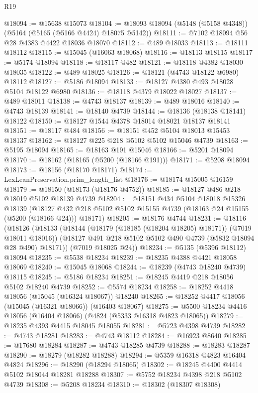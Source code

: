 \begin{lexlean}{R19}
\begin{coremodule}
{{{{{{{{{{{@18094 := @15638 @15073
@18104 := @18093 @18094 (@5148 (@5158 @4348)) (@5164 (@5165 (@5166 @4424) @18075 @5142))
@18111 := @7102 @18094 @56 @28 @4383 @4422 @18036 @18070
@18112 := @489 @18033
@18113 := @18111 @18112
@18115 := @15045 (@16063 @18068)
@18116 := @18113 @18115
@18117 := @5174 @18094
@18118 := @18117 @482
@18121 := @18118 @4382 @18030 @18035
@18122 := @489 @18025
@18126 := @18121 (@4743 @18122 @6980) @18112
@18127 := @5186 @18094
@18133 := @18127 @4380 @493 @18028 @5104 @18122 @6980
@18136 := @18118 @4379 @18022 @18027
@18137 := @489 @18011
@18138 := @4743 @18137
@18139 := @489 @18016
@18140 := @4743 @18139
@18141 := @18140 @4739
@18144 := @18136 (@18138 @18141) @18122
@18150 := @18127 @1544 @4378 @18014 @18021 @18137 @18141
@18151 := @18117 @484
@18156 := @18151 @452 @5104 @18013 @15453 @18137
@18162 := @18127 @225 @218 @5102 @5102 @15046 @4739
@18163 := @5195 @18094
@18165 := @18163 @191 @15046
@18166 := @5201 @18094
@18170 := @18162 (@18165 (@5200 (@18166 @191)))
@18171 := @5208 @18094
@18173 := @18156 (@18170 @18171)
@18174 := LexLeanPreservation.prim_length_list
@18176 := @18174 @15005 @16159
@18179 := @18150 (@18173 (@18176 @4752))
@18185 := @18127 @486 @218 @18019 @5102 @18139 @4739
@18204 := @18151
    @434
    @5104
    @18018
    @15326
    @18139
    (@18127 @432 @218 @5102 @5102 @15155 @4739 (@18163 @24 @15155 (@5200 (@18166 @24))) @18171)
@18205 := @18176 @4744
@18231 := @18116
    (@18126
      (@18133
        (@18144 (@18179 (@18185 (@18204 @18205) @18171)) (@7019 @18011 @18016))
        (@18127 @491 @218 @5102 @5102 @490 @4739 (@5832 @18094 @28 @490) @18171))
      (@7019 @18025 @24))
@18234 := @5135 (@5396 @18112) @18094
@18235 := @5538 @18234
@18239 := @18235 @4388 @4421 @18058 @18069
@18240 := @15045 @18068
@18244 := @18239 (@4743 @18240 @4739) @18115
@18245 := @5186 @18234
@18251 := @18245 @4419 @218 @18056 @5102 @18240 @4739
@18252 := @5574 @18234
@18258 := @18252 @4418 @18056 (@15045 (@16324 @18067)) @18240
@18265 := @18252 @4417 @18056 (@15045 (@16321 @18066)) (@16403 @18067)
@18275 := @5500 @18234 @4416 @18056 (@16404 @18066) (@4824 (@5333 @16318 @4823 @18065))
@18279 := @18235 @4393 @4415 @18045 @18055
@18281 := @5723 @4398 @4739
@18282 := @4743 @18281
@18283 := @4743 @18112
@18284 := @16923 @8640
@18285 := @17680 @18284
@18287 := @4743 @18285 @4739
@18288 := @18283 @18287
@18290 := @18279 (@18282 @18288)
@18294 := @5359 @16318 @4823 @16404 @4824
@18296 := @18290 (@18294 @18065)
@18302 := @18245 @4400 @4414 @5102 @18044 @18281 @18288
@18307 := @5752 @18234 @4398 @218 @5102 @4739
@18308 := @5208 @18234
@18310 := @18302 (@18307 @18308)
}}}}}}}}}}}
\end{coremodule}
\end{lexlean}
